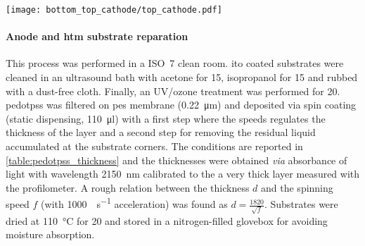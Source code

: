 		\begin{SCfigure}
			\centering
			\texttt{[image: bottom\_top\_cathode/top\_cathode.pdf]}
			\label{fig:top_cathode}
		\end{SCfigure}

		\paragraph{Anode and \gls{htm} substrate reparation}
		This process was performed in a ISO~7 clean room.
		\Gls{ito} coated substrates were cleaned in an ultrasound bath with acetone for \SI{15}{\min}, isopropanol for \SI{15}{\min} and rubbed with a dust-free cloth.
		Finally, an UV/ozone treatment was performed for \SI{20}{\min}.
		\Gls{pedotpss} was filtered on \gls{pes} membrane (\SI{0.22}{\um})
		and deposited via spin coating (static dispensing, \SI{110}{\ul}) with a first step where the speeds regulates the thickness of the layer and a second step for removing the residual liquid accumulated at the substrate corners.
		The conditions are reported in \cref{table:pedotpss_thickness} and the thicknesses were obtained \textsl{via} absorbance of light with wavelength \SI{2150}{\nm} calibrated to the a very thick layer measured with the profilometer.
		A rough relation between the thickness $d$ and the spinning speed $f$ (with \SI{1000}{\rpm\per\s} acceleration) was found as $d = \frac{1820}{\sqrt{f}}$.
		Substrates were dried at \SI{110}{\celsius} for \SI{20}{\min} and stored in a nitrogen-filled glovebox for avoiding moisture absorption.


